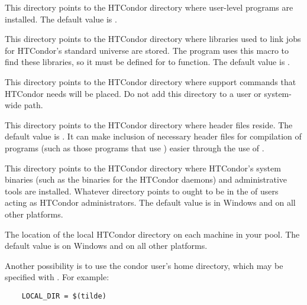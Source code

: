 \begin{description}
\label{param:Bin}
\item[\Macro{BIN}]
  This directory points to the
  HTCondor directory where user-level programs are installed.
  The default value is .
  
\label{param:Lib}
\item[\Macro{LIB}]
  This directory points to the
  HTCondor directory where libraries used to link jobs for HTCondor's
  standard universe are stored.  The  program uses
  this macro to find these libraries, so it must be defined for
   to function.
  The default value is .

\label{param:LibExec}
\item[\Macro{LIBEXEC}]
  This directory points
  to the HTCondor directory where support commands that HTCondor
  needs will be placed.
  Do not add this directory to a user or system-wide path.

\label{param:Include}
\item[\Macro{INCLUDE}]
  This directory points to the HTCondor directory where header files reside.
  The default value is .
  It can make inclusion of necessary header files
  for compilation of programs (such as those programs
  that use )
  easier through the use of .

\label{param:Sbin}
\item[\Macro{SBIN}]
  This directory points to the
  HTCondor directory where HTCondor's system binaries (such as the
  binaries for the HTCondor daemons) and administrative tools are
  installed.  Whatever directory  points to ought
  to be in the  of users acting as HTCondor
  administrators.
  The default value is  in Windows and
   on all other platforms.

\label{param:LocalDir}
\item[\Macro{LOCAL\_DIR}]
  The location of the
  local HTCondor directory on each machine in your pool.
  The default value is  on Windows and
   on all other
  platforms.
  
  Another possibility
  is to use the condor user's home directory, which may be
  specified with . For example:
  \begin{verbatim}
    LOCAL_DIR = $(tilde)
  \end{verbatim}


\end{description}
